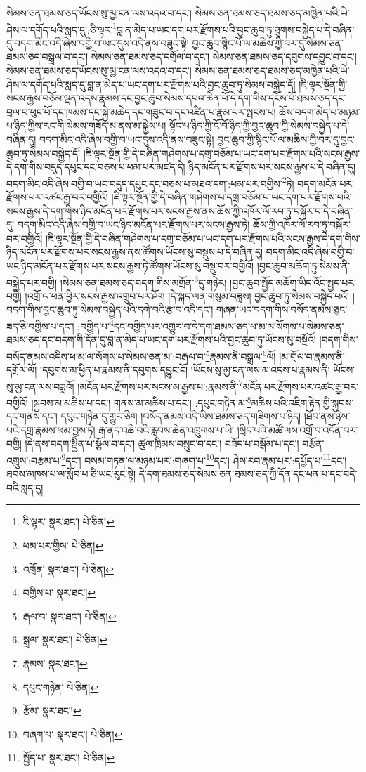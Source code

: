 སེམས་ཅན་ཐམས་ཅད་ཡོངས་སུ་མྱ་ངན་ལས་འདའ་བ་དང་། སེམས་ཅན་ཐམས་ཅད་ཐམས་ཅད་མཁྱེན་པའི་ཡེ་ཤེས་ལ་དགོད་པའི་སླད་དུ་:ཅི་ལྟར་\footnote{ཇི་ལྟར་  སྣར་ཐང་།  པེ་ཅིན། }བླ་ན་མེད་པ་ཡང་དག་པར་རྫོགས་པའི་བྱང་ཆུབ་ཏུ་ཐུགས་བསྐྱེད་པ་དེ་བཞིན་དུ་བདག་མིང་འདི་ཞེས་བགྱི་བ་ཡང་དུས་འདི་ནས་བཟུང་སྟེ། བྱང་ཆུབ་སྙིང་པོ་ལ་མཆིས་ཀྱི་བར་དུ་སེམས་ཅན་ཐམས་ཅད་བསྒྲལ་བ་དང་། སེམས་ཅན་ཐམས་ཅད་དགྲོལ་བ་དང་། སེམས་ཅན་ཐམས་ཅད་དབུགས་དབྱུང་བ་དང་། སེམས་ཅན་ཐམས་ཅད་ཡོངས་སུ་མྱ་ངན་ལས་འདའ་བ་དང་། སེམས་ཅན་ཐམས་ཅད་ཐམས་ཅད་མཁྱེན་པའི་ཡེ་ཤེས་ལ་དགོད་པའི་སླད་དུ་བླ་ན་མེད་པ་ཡང་དག་པར་རྫོགས་པའི་བྱང་ཆུབ་ཏུ་སེམས་བསྐྱེད་དོ། །ཇི་ལྟར་སྔོན་གྱི་སངས་རྒྱས་བཅོམ་ལྡན་འདས་རྣམས་དང་བྱང་ཆུབ་སེམས་དཔའ་ཆེན་པོ་དེ་དག་གིས་དངོས་པོ་ཐམས་ཅད་དང་བྲལ་བ་ཕུང་པོ་དང་ཁམས་དང་སྐྱེ་མཆེད་དང་གཟུང་བ་དང་འཛིན་པ་རྣམ་པར་སྤངས་པ། ཆོས་བདག་མེད་པ་མཉམ་པ་ཉིད་ཀྱིས་རང་གི་སེམས་གཟོད་མ་ནས་མ་སྐྱེས་པ། སྟོང་པ་ཉིད་ཀྱི་ངོ་བོ་ཉིད་ཀྱི་བྱང་ཆུབ་ཀྱི་སེམས་བསྐྱེད་པ་དེ་བཞིན་དུ། བདག་མིང་འདི་ཞེས་བགྱི་བ་ཡང་དུས་འདི་ནས་བཟུང་སྟེ། བྱང་ཆུབ་ཀྱི་སྙིང་པོ་ལ་མཆིས་ཀྱི་བར་དུ་བྱང་ཆུབ་ཏུ་སེམས་བསྐྱེད་དོ། །ཇི་ལྟར་སྔོན་གྱི་དེ་བཞིན་གཤེགས་པ་དགྲ་བཅོམ་པ་ཡང་དག་པར་རྫོགས་པའི་སངས་རྒྱས་དེ་དག་གིས་བདུད་དཔུང་དང་བཅས་པ་ཕམ་པར་མཛད་དེ། ཉིད་མངོན་པར་རྫོགས་པར་སངས་རྒྱས་པ་དེ་བཞིན་དུ། བདག་མིང་འདི་ཞེས་བགྱི་བ་ཡང་བདུད་དཔུང་དང་བཅས་པ་མཐའ་དག་:ཕམ་པར་བགྱིས་\footnote{ཕམ་པར་གྱིས་  པེ་ཅིན། }ཏེ། བདག་མངོན་པར་རྫོགས་པར་འཚང་རྒྱ་བར་བགྱིའོ། །ཇི་ལྟར་སྔོན་གྱི་དེ་བཞིན་གཤེགས་པ་དགྲ་བཅོམ་པ་ཡང་དག་པར་རྫོགས་པའི་སངས་རྒྱས་དེ་དག་གིས་ཉིད་མངོན་པར་རྫོགས་པར་སངས་རྒྱས་ནས་ཆོས་ཀྱི་འཁོར་ལོ་རབ་ཏུ་བསྐོར་བ་དེ་བཞིན་དུ། བདག་མིང་འདི་ཞེས་བགྱི་བ་ཡང་ཉིད་མངོན་པར་རྫོགས་པར་སངས་རྒྱས་ཏེ། ཆོས་ཀྱི་འཁོར་ལོ་རབ་ཏུ་བསྐོར་བར་བགྱིའོ། །ཇི་ལྟར་སྔོན་གྱི་དེ་བཞིན་གཤེགས་པ་དགྲ་བཅོམ་པ་ཡང་དག་པར་རྫོགས་པའི་སངས་རྒྱས་དེ་དག་གིས་ཉིད་མངོན་པར་རྫོགས་པར་སངས་རྒྱས་ནས་ཚོགས་ཡོངས་སུ་བསྡུས་པ་དེ་བཞིན་དུ། བདག་མིང་འདི་ཞེས་བགྱི་བ་ཡང་ཉིད་མངོན་པར་རྫོགས་པར་སངས་རྒྱས་ཏེ་ཚོགས་ཡོངས་སུ་བསྡུ་བར་བགྱིའོ། །བྱང་ཆུབ་མཆོག་ཏུ་སེམས་ནི་བསྐྱེད་པར་བགྱི། །སེམས་ཅན་ཐམས་ཅད་བདག་གིས་མགྲོན་\footnote{འགྲོན་  སྣར་ཐང་།  པེ་ཅིན། }དུ་གཉེར། །བྱང་ཆུབ་སྤྱོད་མཆོག་ཡིད་འོང་སྤྱད་པར་བགྱི། །འགྲོ་ལ་ཕན་ཕྱིར་སངས་རྒྱས་འགྲུབ་པར་ཤོག །དེ་སྐད་ལན་གསུམ་བཟླས། བྱང་ཆུབ་ཏུ་སེམས་བསྐྱེད་པའོ། །བདག་གིས་བྱང་ཆུབ་ཏུ་སེམས་བསྐྱེད་པའི་དགེ་བའི་རྩ་བ་འདི་དང་། གཞན་ཡང་བདག་གིས་བསོད་ནམས་ཅུང་ཟད་ཅི་བགྱིས་པ་དང་། :བགྱིད་པ་\footnote{བགྱིས་པ་  སྣར་ཐང་། }དང་བགྱིད་པར་འགྱུར་བ་དེ་དག་ཐམས་ཅད་ཕ་མ་ལ་སོགས་པ་སེམས་ཅན་ཐམས་ཅད་དང་བདག་གི་དོན་དུ་བླ་ན་མེད་པ་ཡང་དག་པར་རྫོགས་པའི་བྱང་ཆུབ་ཏུ་ཡོངས་སུ་བསྔོའོ། །བདག་གིས་བསོད་ནམས་འདིས་ཕ་མ་ལ་སོགས་པ་སེམས་ཅན་མ་:བརྒལ་བ་\footnote{རྒལ་བ་  སྣར་ཐང་།  པེ་ཅིན། }རྣམས་ནི་བསྒྲལ་\footnote{སྒྲལ་  སྣར་ཐང་།  པེ་ཅིན། }ལོ། །མ་གྲོལ་བ་རྣམས་ནི་དགྲོལ་ལོ། །དབུགས་མ་ཕྱིན་པ་རྣམས་ནི་དབུགས་དབྱུང་ངོ། །ཡོངས་སུ་མྱ་ངན་ལས་མ་འདས་པ་རྣམས་ནི། ཡོངས་སུ་མྱ་ངན་ལས་བཟླའོ། །མངོན་པར་རྫོགས་པར་སངས་མ་རྒྱས་པ་:རྣམས་ནི་\footnote{རྣམས་  སྣར་ཐང་། }མངོན་པར་རྫོགས་པར་འཚང་རྒྱ་བར་བགྱིའོ། །སྐྱབས་མ་མཆིས་པ་དང་། གནས་མ་མཆིས་པ་དང་། :དཔུང་གཉེན་མ་\footnote{དཔུང་གཉེན་  པེ་ཅིན། }མཆིས་པའི་འཇིག་རྟེན་གྱི་སྐྱབས་དང་གནས་དང་། དཔུང་གཉེན་དུ་གྱུར་ཅིག །བསོད་ནམས་འདི་ཡིས་ཐམས་ཅད་གཟིགས་པ་ཉིད། །ཐོབ་ནས་ཉེས་པའི་དགྲ་རྣམས་ཕམ་བྱས་ཏེ། རྒ་ནད་འཆི་བའི་རླབས་ཆེན་འཁྲུགས་པ་ཡི། །སྲིད་པའི་མཚོ་ལས་འགྲོ་བ་འདོན་བར་བགྱི། །དེ་ནས་བདག་སྦྱིན་པ་སྩོལ་བ་དང་། ཚུལ་ཁྲིམས་བསྲུང་བ་དང་། བཟོད་པ་བསྒོམ་པ་དང་། བརྩོན་འགྲུས་:བརྩམ་པ་\footnote{རྩོམ་  སྣར་ཐང་། }དང་། བསམ་གཏན་ལ་མཉམ་པར་:གཞག་པ་\footnote{བཞག་པ་  སྣར་ཐང་།  པེ་ཅིན། }དང་། ཤེས་རབ་རྣམ་པར་:དཔྱོད་པ་\footnote{སྤྱོད་པ་  སྣར་ཐང་།  པེ་ཅིན། }དང་། ཐབས་མཁས་པ་ལ་སློབ་པ་ཅི་ཡང་རུང་སྟེ། དེ་དག་ཐམས་ཅད་སེམས་ཅན་ཐམས་ཅད་ཀྱི་དོན་དང་ཕན་པ་དང་བདེ་བའི་སླད་དུ། 